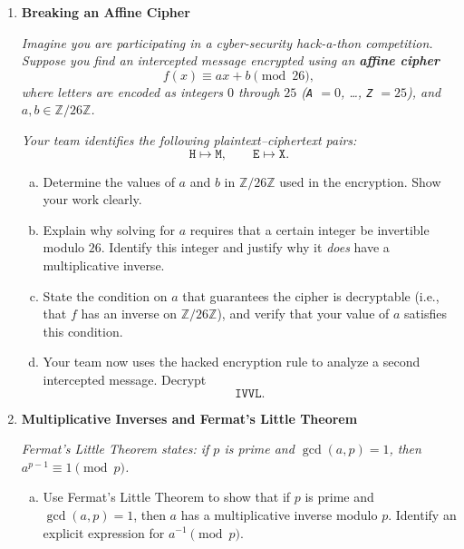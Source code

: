 \documentclass[12pt]{article}
\begin{document}
\begin{enumerate}
\begin{enumerate}[(a)]
\end{enumerate}

\bigskip

\item \textbf{Breaking an Affine Cipher}

\textit{Imagine you are participating in a cyber-security hack-a-thon competition.
Suppose you find an intercepted message encrypted using an \textbf{affine cipher}}
\[
  f(x) \equiv ax + b \pmod{26},
\]
\textit{where letters are encoded as integers $0$ through $25$
(\texttt{A} $=0$, \ldots, \texttt{Z} $=25$), and $a,b \in \mathbb{Z}/26\mathbb{Z}$.}

\medskip
\textit{Your team identifies the following plaintext--ciphertext pairs:}
\[
\texttt{H} \mapsto \texttt{M}, \qquad \texttt{E} \mapsto \texttt{X}.
\]

\begin{enumerate}[(a)]

\item Determine the values of $a$ and $b$ in $\mathbb{Z}/26\mathbb{Z}$ used in the encryption.
Show your work clearly.

\item Explain why solving for $a$ requires that a certain integer be
invertible modulo $26$.  Identify this integer and justify why it
\emph{does} have a multiplicative inverse.

\item State the condition on $a$ that guarantees the cipher is
decryptable (i.e., that $f$ has an inverse on $\mathbb{Z}/26\mathbb{Z}$),
and verify that your value of $a$ satisfies this condition.

\item Your team now uses the hacked encryption rule to analyze a second
intercepted message.  Decrypt
\[
\texttt{IVVL}.
\]

\bigskip 

\end{enumerate}

\item \textbf{Multiplicative Inverses and Fermat's Little Theorem}

\textit{Fermat's Little Theorem states: if $p$ is prime and
$\gcd(a,p)=1$, then $a^{p-1} \equiv 1 \pmod{p}$.}

\begin{enumerate}[(a)]

\item Use Fermat's Little Theorem to show that if $p$ is prime and
$\gcd(a,p)=1$, then $a$ has a multiplicative inverse modulo $p$.
Identify an explicit expression for $a^{-1} \pmod{p}$.


\end{enumerate}
\end{enumerate}
\end{document}
